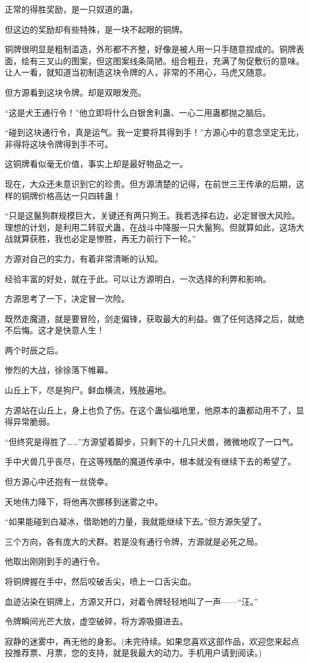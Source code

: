 \begin{this_body}
正常的得胜奖励，是一只奴道的蛊。

但这边的奖励却有些特殊，是一块不起眼的铜牌。

铜牌很明显是粗制滥造，外形都不齐整，好像是被人用一只手随意捏成的。铜牌表面，绘有三叉山的图案，但这图案线条简陋。组合粗丑，充满了匆促敷衍的意味。让人一看，就知道当初制造这块令牌的人，非常的不用心，马虎又随意。

但方源看到这块令牌。却是双眼发亮。

“这是犬王通行令！”他立即将什么白银舍利蛊、一心二用蛊都抛之脑后。

“碰到这块通行令，真是运气。我一定要将其得到手！”方源心中的意念坚定无比，非得将这块令牌得到手不可。

这铜牌看似毫无价值，事实上却是最好物品之一。

现在，大众还未意识到它的珍贵。但方源清楚的记得，在前世三王传承的后期，这样的铜牌价格高达一只四转蛊！

“只是这鬣狗群规模巨大，关键还有两只狗王。我若选择右边，必定冒很大风险。理想的计划，是利用二转驭犬蛊，在战斗中降服一只大鬣狗。但就算如此，这场大战就算获胜，我也必定是惨胜，再无力前行下一轮。”

方源对自己的实力，有着非常清晰的认知。

经验丰富的好处，就在于此。可以让方源明白，一次选择的利弊和影响。

方源思考了一下，决定冒一次险。

既然走魔道，就是要冒险，剑走偏锋，获取最大的利益。做了任何选择之后，就绝不后悔。这才是快意人生！

两个时辰之后。

惨烈的大战，徐徐落下帷幕。

山丘上下，尽是狗尸。鲜血横流，残肢遍地。

方源站在山丘上，身上也负了伤。在这个蛊仙福地里，他原本的蛊都动用不了，显得异常脆弱。

“但终究是得胜了……”方源望着脚步，只剩下的十几只犬兽，微微地叹了一口气。

手中犬兽几乎丧尽，在这等残酷的魔道传承中，根本就没有继续下去的希望了。

但方源心中还抱有一丝侥幸。

天地伟力降下，将他再次挪移到迷雾之中。

“如果能碰到白凝冰，借助她的力量，我就能继续下去。”但方源失望了。

三个方向，各有庞大的犬群。若是没有通行令牌，方源就是必死之局。

他取出刚刚到手的通行令。

将铜牌握在手中，然后咬破舌尖，喷上一口舌尖血。

血迹沾染在铜牌上，方源又开口，对着令牌轻轻地叫了一声——“汪。”

令牌瞬间光芒大放，虚空破碎，将方源吸摄进去。

寂静的迷雾中，再无他的身影。(未完待续。如果您喜欢这部作品，欢迎您来起点投推荐票、月票，您的支持，就是我最大的动力。手机用户请到阅读。)

\end{this_body}

